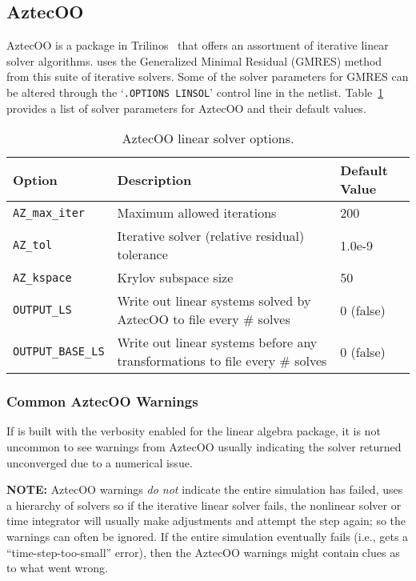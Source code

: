 \subsection{AztecOO}
AztecOO is a package in Trilinos~\cite{trilinos:toms} that offers an assortment of iterative linear solver algorithms.  
\Xyce{} uses the Generalized Minimal Residual (GMRES) method~\cite{sasc86} from this suite of iterative solvers.  
Some of the solver parameters for GMRES can be altered through the `\texttt{.OPTIONS LINSOL}' control line in the netlist. 
Table~\ref{tab:aztecoo:options} provides a list of solver parameters for AztecOO and their default values.

\begin{table}[htp]
\caption[AztecOO linear solver options.]{AztecOO linear solver options.}
\label{tab:aztecoo:options}
\begin{center}
\begin{tabular}{| p{3cm} | p{9cm} | p{2.5cm} |}
\hline
Option & Description & Default Value \\
\hline
{\tt AZ\_max\_iter}        & Maximum allowed iterations & 200 \\
{\tt AZ\_tol}              & Iterative solver (relative residual) tolerance & 1.0e-9 \\
{\tt AZ\_kspace}           & Krylov subspace size & 50 \\
{\tt OUTPUT\_LS}           & Write out linear systems solved by AztecOO to file every \# solves & 0 (false)\\
{\tt OUTPUT\_BASE\_LS}     & Write out linear systems before any transformations to file every \# solves & 0 (false)\\
\hline
\end{tabular}
\end{center}
\end{table}

\subsubsection{Common AztecOO Warnings}

If \Xyce{} is built with the verbosity enabled for the linear algebra package, it is not
uncommon to see warnings from AztecOO usually indicating the solver returned unconverged due to a numerical issue.

\begin{center}
\begin{minipage}{0.85\textwidth}
\color{XyceRed} {\bf NOTE:  }\color{black}  AztecOO warnings {\em do not} indicate the entire simulation has failed, \Xyce{} uses a hierarchy of solvers so if the iterative linear solver fails, the nonlinear solver or time integrator will usually make adjustments and attempt the step again; so the warnings can often be ignored. If the entire simulation eventually fails (i.e., gets a ``time-step-too-small'' error), then the AztecOO warnings might contain clues as to what went wrong.
\end{minipage}
\end{center}

